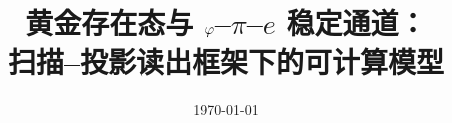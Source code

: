 \documentclass[11pt,letterpaper]{ctexart}
\title{黄金存在态与 $\varphi$--$\pi$--$e$ 稳定通道：\\\large 扫描--投影读出框架下的可计算模型}
\author{}
\date{\today}
\begin{document}
\maketitle













\FloatBarrier
\appendix






\FloatBarrier

\end{document}
